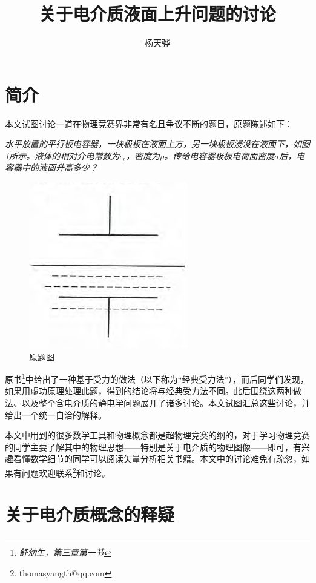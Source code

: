 \documentclass{ctexart}
\title{关于电介质液面上升问题的讨论}
\author{杨天骅}
\newcommand{\epsr}{\epsilon_r}
\begin{document}
	\maketitle
	\tableofcontents
	
	\newpage
	
	\section{简介}
	
	本文试图讨论一道在物理竞赛界非常有名且争议不断的题目，原题陈述如下：
	
	{\itshape 水平放置的平行板电容器，一块极板在液面上方，另一块极板浸没在液面下，如图\ref{fig:orig}所示。液体的相对介电常数为$\epsr$，密度为$\rho$。传给电容器极板电荷面密度$\sigma$后，电容器中的液面升高多少？}
	
	\begin{figure}[htbp!]
		\centering
		\includegraphics{Orig.png}
		\caption{原题图}
		\label{fig:orig}
	\end{figure}
	
	原书\footnote{\textit{舒幼生，第三章第一节}}中给出了一种基于受力的做法（以下称为“经典受力法”），而后同学们发现，如果用虚功原理处理此题，得到的结论将与经典受力法不同。此后围绕这两种做法、以及整个含电介质的静电学问题展开了诸多讨论。本文试图汇总这些讨论，并给出一个统一自洽的解释。
	
	本文中用到的很多数学工具和物理概念都是超物理竞赛的纲的，对于学习物理竞赛的同学主要了解其中的物理思想——特别是关于电介质的物理图像——即可，有兴趣看懂数学细节的同学可以阅读矢量分析相关书籍。本文中的讨论难免有疏忽，如果有问题欢迎联系\footnote{thomasyangth@qq.com}和讨论。
	
	\section{关于电介质概念的释疑}
	
\end{document}
